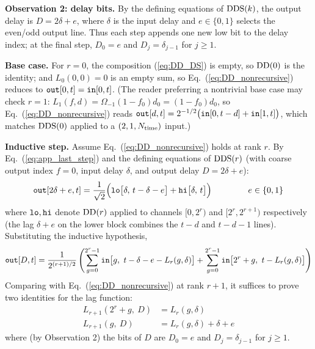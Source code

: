 \documentclass{article}
\numberwithin{equation}{section}   %
\def\DDS{{\rm DDS}}
\def\DD{{\rm DD}}
\begin{document}
\par\noindent
{\bf Observation 2: delay bits.}
By the defining equations of $\DDS(k)$, the output delay is $D = 2\delta + e$, where $\delta$ is
the input delay and $e \in \{0,1\}$ selects the even/odd output line. Thus each step appends one
new low bit to the delay index; at the final step, $D_0 = e$ and $D_j = \delta_{j-1}$ for
$j \ge 1$.

\par\noindent
{\bf Base case.}
For $r=0$, the composition (\ref{eq:DD_DS}) is empty, so $\DD(0)$ is the identity; and
$L_0(0,0) = 0$ is an empty sum, so Eq.\ (\ref{eq:DD_nonrecursive}) reduces to
${\tt out}[0,t] = {\tt in}[0,t]$. (The reader preferring a nontrivial base case may check $r=1$:
$L_1(f,d) = \Omega_{-1} (1-f_0) d_0 = (1-f_0) d_0$, so Eq.\ (\ref{eq:DD_nonrecursive}) reads
${\tt out}[d,t] = 2^{-1/2} \big( {\tt in}[0,t-d] + {\tt in}[1,t] \big)$, which matches $\DDS(0)$
applied to a $(2,1,N_{\rm time})$ input.)

\par\noindent
{\bf Inductive step.}
Assume Eq.\ (\ref{eq:DD_nonrecursive}) holds at rank $r$. By Eq.\ (\ref{eq:app_last_step}) and
the defining equations of $\DDS(r)$ (with coarse output index $f=0$, input delay $\delta$, and
output delay $D = 2\delta + e$):
\begin{equation}
{\tt out}[2\delta+e, t] = \frac{1}{\sqrt{2}}
  \Big( {\tt lo}\big[\delta,\, t - \delta - e\big] + {\tt hi}\big[\delta,\, t\big] \Big)
  \hspace{1.5cm} e \in \{0,1\}
\end{equation}
where ${\tt lo}, {\tt hi}$ denote $\DD(r)$ applied to channels $[0, 2^r)$ and $[2^r, 2^{r+1})$
respectively (the lag $\delta + e$ on the lower block combines the $t-d$ and $t-d-1$ lines).
Substituting the inductive hypothesis,
\begin{equation}
{\tt out}[D, t] = \frac{1}{2^{(r+1)/2}} \left(
  \sum_{g=0}^{2^r-1} {\tt in}\big[g,\ t - \delta - e - L_r(g,\delta)\big]
  + \sum_{g=0}^{2^r-1} {\tt in}\big[2^r + g,\ t - L_r(g,\delta)\big] \right)
\end{equation}
Comparing with Eq.\ (\ref{eq:DD_nonrecursive}) at rank $r+1$, it suffices to prove two
identities for the lag function:
\begin{align}
L_{r+1}(2^r + g,\ D) &= L_r(g, \delta)  \label{eq:app_lag_upper} \\
L_{r+1}(g,\ D) &= L_r(g, \delta) + \delta + e  \label{eq:app_lag_lower}
\end{align}
where (by Observation 2) the bits of $D$ are $D_0 = e$ and $D_j = \delta_{j-1}$ for $j \ge 1$.
\end{document}
